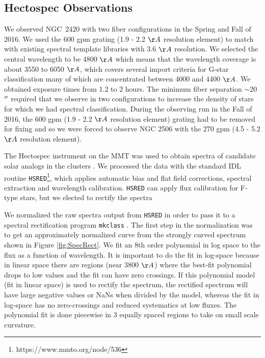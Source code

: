 \documentclass{aastex6}
\begin{document}
\subsection{Hectospec Observations}
We observed NGC~2420 with two fiber configurations in the Spring and Fall of 2016.
We used the 600 gpm grating (1.9 - 2.2 $\AA$ resolution element) to match with existing spectral template libraries with 3.6 $\AA$ resolution.
We selected the central wavelength to be 4800 $\AA$ which means that the wavelength coverage is about 3550 to 6050 $\AA$, which covers several import criteria for G-star classification many of which are concentrated between 4000 and 4400 $\AA$.
We obtained exposure times from 1.2 to 2 hours.
The minimum fiber separation $\sim$20$\mbox{$^{\prime\prime}$}$ required that we observe in two configurations to increase the density of stars for which we had spectral classification.
During the observing run in the Fall of 2016, the 600 gpm (1.9 - 2.2 $\AA$ resolution element) grating had to be removed for fixing and so we were forced to observe NGC 2506 with the 270 gpm (4.5 - 5.2 $\AA$ resolution element).

The Hectospec instrument on the MMT \citep{fabricant2005hectospec,mink2007hectoFibers} was used to obtain spectra of candidate solar analogs in the clusters .
We processed the data with the standard IDL routine \texttt{HSRED}\footnote{https://www.mmto.org/node/536}, which applies automatic bias and flat field corrections, spectral extraction and wavelength calibration.
\texttt{HSRED} can apply flux calibration for F-type stars, but we elected to rectify the spectra 

We normalized the raw spectra output from \texttt{HSRED} in order to pass it to a spectral rectification program \texttt{mkclass} \citep{gray2014classification}.
The first step in the normalization was to get an approximately normalized curve from the strongly curved spectrum shown in Figure \ref{fig:SpecRect}.
We fit an 8th order polynomial in log space to the flux as a function of wavelength.
It is important to do the fit in log-space because in linear space there are regions (near 3800 $\AA$) where the best-fit polynomial drops to low values and the fit can have zero crossings.
If this polynomial model (fit in linear space) is used to rectify the spectrum, the rectified spectrum will have large negative values or NaNs when divided by the model, whereas the fit in log-space has no zero-crossings and reduced systematics at low fluxes.
The polynomial fit is done piecewise in 3 equally spaced regions to take on small scale curvature.
\end{document}
